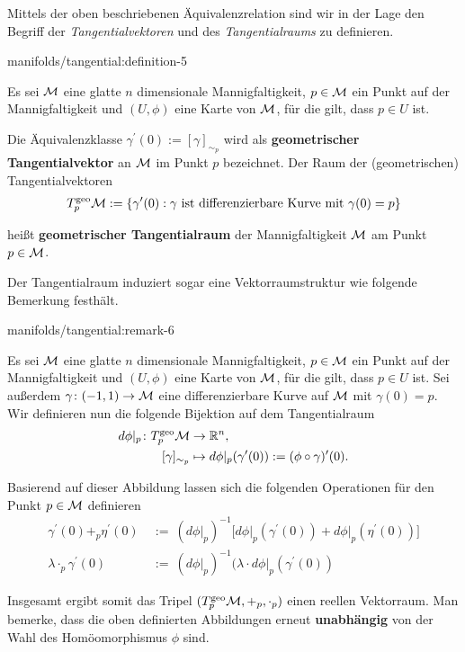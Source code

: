 \par
Mittels der oben beschriebenen Äquivalenzrelation sind wir in der Lage den Begriff der \emph{Tangentialvektoren} und des \emph{Tangentialraums} zu definieren.
\begin{definition}{}{manifolds/tangential:definition-5}



\par
Es sei \(\mathcal{M}\) eine glatte \(n\) dimensionale Mannigfaltigkeit, \(p\in\mathcal{M}\) ein Punkt auf der Mannigfaltigkeit und \((U,\phi)\) eine Karte von \(\mathcal{M}\), für die gilt, dass \(p\in U\) ist.

\par
Die Äquivalenzklasse \(\gamma^\prime(0):=[\gamma]_{\sim_p}\) wird als \textbf{geometrischer Tangentialvektor} an \(\mathcal{M}\) im Punkt \(p\) bezeichnet.
Der Raum der (geometrischen) Tangentialvektoren
\begin{align*}
T_p^{\text{geo}}\mathcal{M} := \{\gamma^\prime(0): \gamma\text{ ist differenzierbare Kurve mit }\gamma(0)=p\}
\end{align*}
\par
heißt \textbf{geometrischer Tangentialraum} der Mannigfaltigkeit \(\mathcal{M}\) am Punkt \(p \in \mathcal{M}\).
\end{definition}

\par
Der Tangentialraum induziert sogar eine Vektorraumstruktur wie folgende Bemerkung festhält.
\begin{remark}{}{manifolds/tangential:remark-6}



\par
Es sei \(\mathcal{M}\) eine glatte \(n\) dimensionale Mannigfaltigkeit, \(p\in\mathcal{M}\) ein Punkt auf der Mannigfaltigkeit und \((U,\phi)\) eine Karte von \(\mathcal{M}\), für die gilt, dass \(p\in U\) ist.
Sei außerdem \(\gamma \colon (-1,1) \rightarrow \mathcal{M}\) eine differenzierbare Kurve auf \(\mathcal{M}\) mit \(\gamma(0) = p\).
Wir definieren nun die folgende Bijektion auf dem Tangentialraum
\begin{align*}
d\phi\rvert_p \colon T^{\text{geo}}_p\mathcal{M} &\rightarrow \mathbb{R}^n,\\
[\gamma]_{\sim_p} &\mapsto d\phi\rvert_p (\gamma^\prime(0)) := (\phi \circ \gamma)^\prime (0).
\end{align*}
\par
Basierend auf dieser Abbildung lassen sich die folgenden Operationen für den Punkt \(p \in \mathcal{M}\) definieren
\begin{align*}
\gamma^\prime(0) +_{p} \eta^\prime(0) \ &:= \
(d\phi\rvert_p)^{-1}\big[d\phi\rvert_p(\gamma^\prime(0)) + d\phi\rvert_p(\eta^\prime(0))\big]\\
\lambda \cdot_p \gamma^\prime(0) \ &:= \ (d\phi\rvert_p)^{-1} (\lambda \cdot d\phi\rvert_p(\gamma^\prime(0))
\end{align*}
\par
Insgesamt ergibt somit das Tripel \((T_p^{\text{geo}}\mathcal{M}, +_p, \cdot_p)\) einen reellen Vektorraum.
Man bemerke, dass die oben definierten Abbildungen erneut \textbf{unabhängig} von der Wahl des Homöomorphismus \(\phi\) sind.
\end{remark}


